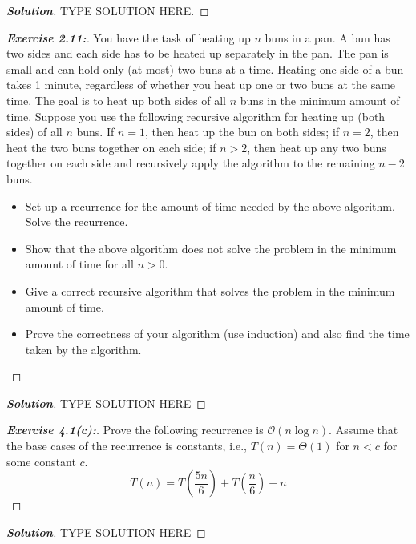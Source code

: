 \documentclass[a4paper]{article}
\newenvironment{solution}{\begin{proof}[\textnormal{\textbf{Solution}}]}{\end{proof}}
\newenvironment{exercise}[1]{\begin{proof}[\textnormal{\textbf{Exercise #1:}}]\renewcommand{\qedsymbol}{}}{\end{proof}}
\newcommand{\bigO}[1]{\mathcal{O}\left(#1\right)}
\newcommand{\bigTh}[1]{\Theta\left(#1\right)}
\begin{document}
\begin{solution}
    TYPE SOLUTION HERE.
\end{solution}

\begin{exercise}{2.11}

    You have the task of heating up \(n\) buns in a pan. A bun has two sides and each side has to be heated up separately in the pan. The pan is small and can hold only (at most) two buns at a time. Heating one side of a bun takes 1 minute, regardless of whether you heat up one or two buns at the same time. The goal is to heat up both sides of all \(n\) buns in the minimum amount of time. Suppose you use the following recursive algorithm for heating up (both sides) of all \(n\) buns. If \(n = 1\), then heat up the bun on both sides;  if \(n = 2\), then heat the two buns together on each side; if \(n > 2\), then heat up any two buns together on each side and recursively apply the algorithm to the remaining \(n − 2\) buns.

    \begin{itemize}
        \item Set up a recurrence for the amount of time needed by the above algorithm. Solve the recurrence.
        \item Show that the above algorithm does not solve the problem in the minimum amount of time for all \(n >0\).
        \item Give a correct recursive algorithm that solves the problem in the minimum amount of time.
        \item Prove the correctness of your algorithm (use induction) and also find the time taken by the algorithm.
    \end{itemize}
\end{exercise}

\begin{solution}
    TYPE SOLUTION HERE
\end{solution}

\begin{exercise}{4.1(c)}
    Prove the following recurrence is \(\bigO{n\log{n}}\). Assume that the base cases of the recurrence is constants, i.e., \(T(n) = \bigTh{1}\) for \(n < c\) for some constant \(c\).
    \[T(n) = T\left(\frac{5n}{6}\right) + T\left(\frac{n}{6}\right) + n\]
\end{exercise}

\begin{solution}
    TYPE SOLUTION HERE
\end{solution}
\end{document}
